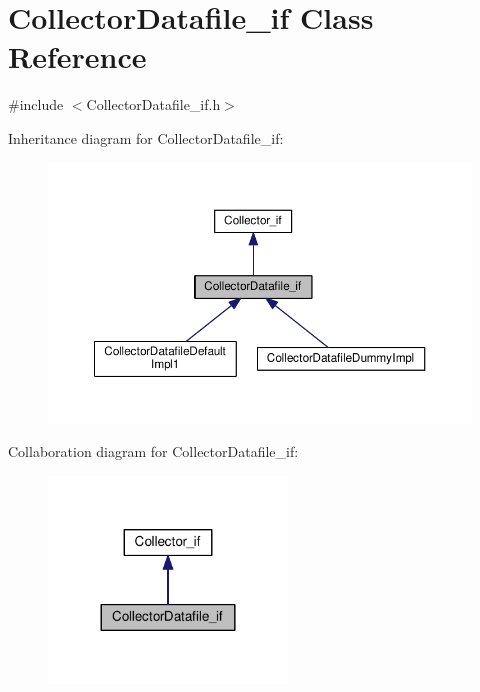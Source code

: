 \hypertarget{class_collector_datafile__if}{}\section{Collector\+Datafile\+\_\+if Class Reference}
\label{class_collector_datafile__if}


{\ttfamily \#include $<$Collector\+Datafile\+\_\+if.\+h$>$}



Inheritance diagram for Collector\+Datafile\+\_\+if\+:\nopagebreak
\begin{figure}[H]
\begin{center}
\leavevmode
\includegraphics[width=350pt]{class_collector_datafile__if__inherit__graph}
\end{center}
\end{figure}


Collaboration diagram for Collector\+Datafile\+\_\+if\+:\nopagebreak
\begin{figure}[H]
\begin{center}
\leavevmode
\includegraphics[width=180pt]{class_collector_datafile__if__coll__graph}
\end{center}
\end{figure}
